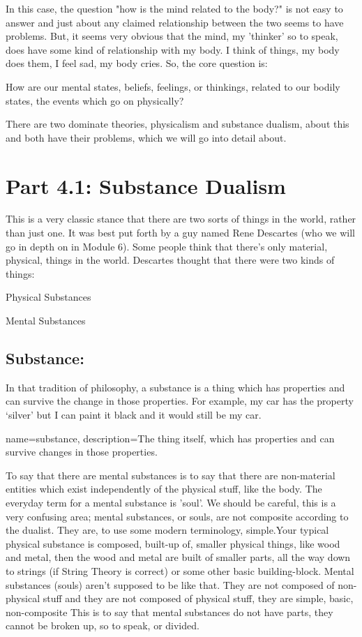 In this case, the question "how is the mind related to the body?" is not easy to answer and just about any claimed relationship between the two seems to have problems. But, it seems very obvious that the mind, my 'thinker' so to speak, does have some kind of relationship with my body. I think of things, my body does them, I feel sad, my body cries. So, the core question is:

\begin{center}How are our mental states, beliefs, feelings, or thinkings, related to our bodily states, the events which go on physically?\end{center}

There are two dominate theories, \gls{physicalism} and \gls{substance dualism}, about this and both have their problems, which we will go into detail about.

\section{Part 4.1: Substance Dualism}

This is a very classic stance that there are two sorts of things in the world, rather than just one. It was best put forth by a guy named Rene Descartes (who we will go in depth on in Module 6). Some people think that there’s only material, physical, things in the world. Descartes thought that there were two kinds of things:
\begin{earg}
    \item[]Physical Substances
    \item[]Mental Substances
\end{earg}
\subsection{Substance:}

In that tradition of philosophy, a \gls{substance} is a thing which has properties and can survive the change in those properties. For example, my car has the property ‘silver’ but I can paint it black and it would still be my car.

{
name=substance,
description={The thing itself, which has properties and can survive changes in those properties.}
}


To say that there are mental substances is to say that there are non-material entities which exist independently of the physical stuff, like the body. The everyday term for a mental substance is 'soul'. We should be careful, this is a very confusing area; mental substances, or souls, are not composite according to the dualist. They are, to use some modern terminology, simple.Your typical physical substance is composed, built-up of, smaller physical things, like wood and metal, then the wood and metal are built of smaller parts, all the way down to strings (if String Theory is correct) or some other basic building-block. Mental substances (souls) aren't supposed to be like that. They are not composed of non-physical stuff and they are not composed of physical stuff, they are simple, basic, non-composite This is to say that mental substances do not have parts, they cannot be broken up, so to speak, or divided. 

